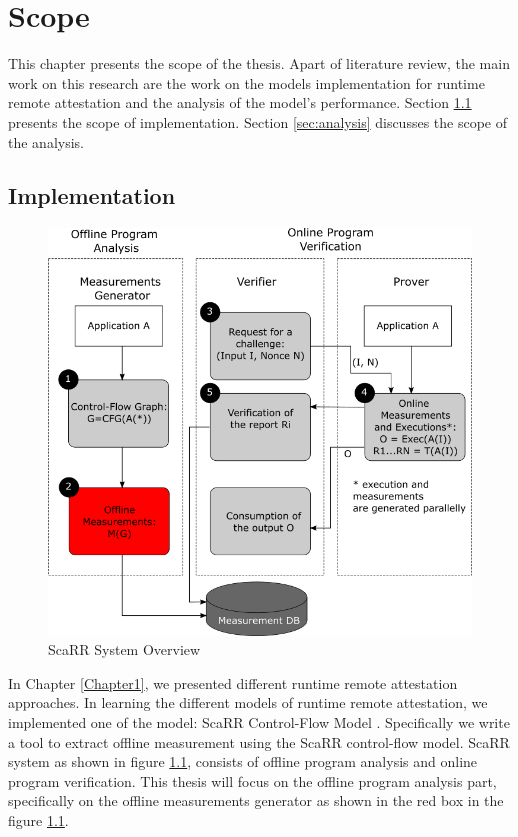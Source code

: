 
\chapter{Scope} %
\label{Chapter2} %

This chapter presents the scope of the thesis. Apart of literature review, the
main work on this research are the work on the models implementation for runtime
remote attestation and the analysis of the model's performance. Section
\ref{sec:implementation} presents the scope of implementation. Section
\ref{sec:analysis} discusses the scope of the analysis.

\section{Implementation}
\label{sec:implementation}

\begin{figure}[htbp]
\centerline{\includegraphics[scale=.5]{Figures/02/scarr-system-overview.png}}
\caption{ScaRR System Overview}
\label{fig:scarr-system-overview}
\end{figure}

In Chapter \ref{Chapter1}, we presented different runtime remote attestation
approaches. In learning the different models of runtime remote attestation, we
implemented one of the model: ScaRR Control-Flow Model
\cite{toffaliniScaRRScalableRuntime2019}. Specifically we write a tool to
extract offline measurement using the ScaRR control-flow model. ScaRR system as
shown in figure \ref{fig:scarr-system-overview}, consists of offline program
analysis and online program verification. This thesis will focus on the offline
program analysis part, specifically on the offline measurements generator as
shown in the red box in the figure \ref{fig:scarr-system-overview}.


